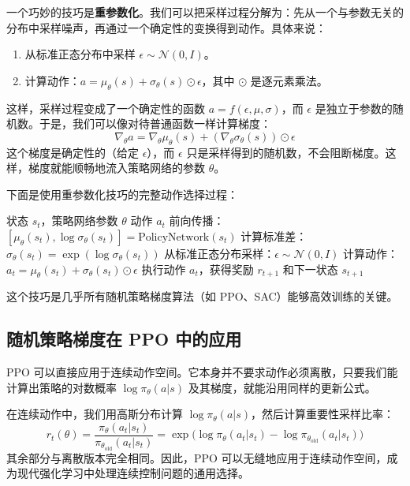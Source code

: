 \documentclass[lang=cn,zihao=-4,a4paper,fontset=windows]{beautybook}
\begin{document}
一个巧妙的技巧是\textbf{重参数化}。我们可以把采样过程分解为：先从一个与参数无关的分布中采样噪声，再通过一个确定性的变换得到动作。具体来说：
\begin{enumerate}
    \item 从标准正态分布中采样 $\epsilon \sim \mathcal{N}(0, I)$。
    \item 计算动作：$a = \mu_\theta(s) + \sigma_\theta(s) \odot \epsilon$，其中 $\odot$ 是逐元素乘法。
\end{enumerate}
这样，采样过程变成了一个确定性的函数 $a = f(\epsilon, \mu, \sigma)$，而 $\epsilon$ 是独立于参数的随机数。于是，我们可以像对待普通函数一样计算梯度：
\[
\nabla_\theta a = \nabla_\theta \mu_\theta(s) + (\nabla_\theta \sigma_\theta(s)) \odot \epsilon
\]
这个梯度是确定性的（给定 $\epsilon$），而 $\epsilon$ 只是采样得到的随机数，不会阻断梯度。这样，梯度就能顺畅地流入策略网络的参数 $\theta$。

下面是使用重参数化技巧的完整动作选择过程：

\begin{algorithm}[H]
\caption{随机策略的动作选择（重参数化版本）}
\begin{algorithmic}[1]
\REQUIRE 状态 $s_t$，策略网络参数 $\theta$
\ENSURE 动作 $a_t$
\STATE 前向传播：$[\mu_\theta(s_t), \log\sigma_\theta(s_t)] = \text{PolicyNetwork}(s_t)$
\STATE 计算标准差：$\sigma_\theta(s_t) = \exp(\log\sigma_\theta(s_t))$
\STATE 从标准正态分布采样：$\epsilon \sim \mathcal{N}(0, I)$
\STATE 计算动作：$a_t = \mu_\theta(s_t) + \sigma_\theta(s_t) \odot \epsilon$
\STATE 执行动作 $a_t$，获得奖励 $r_{t+1}$ 和下一状态 $s_{t+1}$
\end{algorithmic}
\end{algorithm}

这个技巧是几乎所有随机策略梯度算法（如 PPO、SAC）能够高效训练的关键。

\subsection{随机策略梯度在 PPO 中的应用}

PPO 可以直接应用于连续动作空间。它本身并不要求动作必须离散，只要我们能计算出策略的对数概率 $\log \pi_\theta(a|s)$ 及其梯度，就能沿用同样的更新公式。

在连续动作中，我们用高斯分布计算 $\log \pi_\theta(a|s)$，然后计算重要性采样比率：
\[
r_t(\theta) = \frac{\pi_\theta(a_t|s_t)}{\pi_{\theta_{\text{old}}}(a_t|s_t)} = \exp\big(\log \pi_\theta(a_t|s_t) - \log \pi_{\theta_{\text{old}}}(a_t|s_t)\big)
\]
其余部分与离散版本完全相同。因此，PPO 可以无缝地应用于连续动作空间，成为现代强化学习中处理连续控制问题的通用选择。
\end{document}
